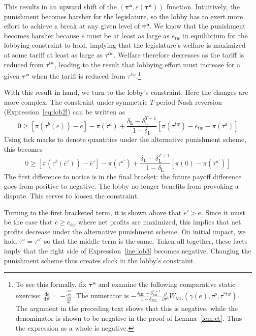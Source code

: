 \documentclass[authoryear, review]{elsarticle}
\newcommand{\ov}{\overline}
\newcommand{\bta}{\bm{\tau^a}}
\newcommand{\ga}{\gamma}
\newcommand{\de}{\delta}
\begin{document}
This results in an upward shift of the $\left(\bta,\ov{e}\left(\bta\right) \right)$ function. Intuitively, the punishment becomes harsher for the legislature, so the lobby has to exert more effort to achieve a break at any given level of $\bta$. We know that the punishment becomes harsher because $\ov{e}$ must be at least as large as $e_{tw}$ in equilibrium for the lobbying constraint to hold, implying that the legislature's welfare is maximized at some tariff at least as large as $\tau^{tw}$. Welfare therefore decreases as the tariff is reduced from $\tau^{tw}$, leading to the result that lobbying effort must increase for a given $\bta$ when the tariff is reduced from $\tau^{tw}$.\footnote{To see this formally, fix $\bta$ and examine the following comparative static exercise:
						$\frac{\mathrm{d} \ov{e}}{\mathrm{d} \tau^p} = -\frac{\frac{\partial \Omega}{\partial \tau^p}}{\frac{\partial \Omega}{\partial \ov{e}}}$. The numerator is $ -\frac{\de_\text{ML} - \de_\text{ML}^{T+1}}{1-\de_\text{ML}}\frac{\partial }{\partial \tau^p} W_{\text{ML}}(\ga(\ov{e}),\tau^p,\tau^{*tw})$. The argument in the preceding text shows that this is negative, while the denominator is shown to be negative in the proof of Lemma~\ref{lem:et}. Thus the expression as a whole is negative.}

With this result in hand, we turn to the lobby's constraint. Here the changes are more complex. The constraint under symmetric $T$-period Nash reversion (Expression~\ref{eq:lob2}) can be written as
	\[
	  0 \geq \left[\pi(\tau^b(\ov{e})) - \ov{e}\right] - \pi(\tau^a) + \frac{\de_\text{L} - \de_\text{L}^{T+1}}{1-\de_\text{L}} \left[\pi(\tau^{tw}) -e_{tw} - \pi(\tau^a) \right]
  \]
Using tick marks to denote quantities under the alternative punishment scheme, this becomes
				\begin{equation}
					0 \geq \left[\pi(\tau^b(\ov{e}')) - \ov{e}'\right] - \pi(\tau^{a'}) + \frac{\de_\text{L} - \de_\text{L}^{T+1}}{1-\de_\text{L}} \left[\pi(0) - \pi(\tau^{a'}) \right]
					\label{ine:lob3}
				\end{equation}
The first difference to notice is in the final bracket: the future payoff difference goes from positive to negative. The lobby no longer benefits from provoking a dispute. This serves to loosen the constraint.

Turning to the first bracketed term, it is shown above that $\ov{e}' > \ov{e}$. Since it must be the case that $\ov{e} \geq e_{tw}$ where net profits are maximized, this implies that net profits decrease under the alternative punishment scheme. On initial impact, we hold $\tau^a = \tau^{a'}$ so that the middle term is the same. Taken all together, these facts imply that the right side of Expression~\ref{ine:lob3} becomes negative. Changing the punishment scheme thus creates slack in the lobby's constraint.
\end{document}

